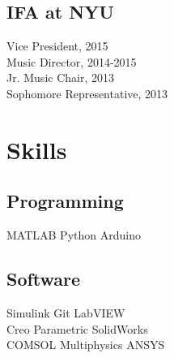 \documentclass[]{deedy-resume-openfont}
\begin{document}
\begin{minipage}[t]{0.33\textwidth}
\subsection{IFA at NYU}
Vice President, 2015\\
Music Director, 2014-2015\\
Jr. Music Chair, 2013\\
Sophomore Representative, 2013



\section{Skills}

\subsection{Programming}

MATLAB \textbullet{}  Python \textbullet{} Arduino

\sectionsep

\subsection{Software}
Simulink \textbullet{} Git \textbullet{} LabVIEW \textbullet{}\\
Creo Parametric \textbullet{} SolidWorks \textbullet{}\\ 
COMSOL Multiphysics \textbullet{}  ANSYS


\sectionsep %

%
%

\end{minipage} 
\hfill
\end{document}
